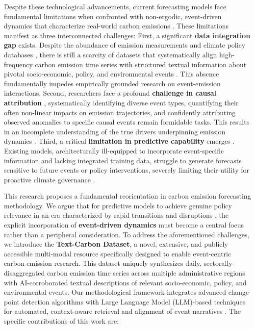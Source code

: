 Despite these technological advancements, current forecasting models face fundamental limitations when confronted with non-ergodic, event-driven dynamics that characterize real-world carbon emissions \cite{peters2022climate}. These limitations manifest as three interconnected challenges: First, a significant \textbf{data integration gap} exists. Despite the abundance of emission measurements \cite{crippa2021edgar} and climate policy databases \cite{nascimento2022global}, there is still a scarcity of datasets that systematically align high-frequency carbon emission time series with structured textual information about pivotal socio-economic, policy, and environmental events \cite{lamb2021climate}. This absence fundamentally impedes empirically grounded research on event-emission interactions. Second, researchers face a profound \textbf{challenge in causal attribution} \cite{gasser2020understanding}, systematically identifying diverse event types, quantifying their often non-linear impacts on emission trajectories, and confidently attributing observed anomalies to specific causal events remain formidable tasks. This results in an incomplete understanding of the true drivers underpinning emission dynamics \cite{liu2022drivers}. Third, a critical \textbf{limitation in predictive capability} emerges \cite{hausfather2020evaluating}. Existing models, architecturally ill-equipped to incorporate event-specific information and lacking integrated training data, struggle to generate forecasts sensitive to future events or policy interventions, severely limiting their utility for proactive climate governance \cite{grant2020cost}.

This research proposes a fundamental reorientation in carbon emission forecasting methodology. We argue that for predictive models to achieve genuine policy relevance in an era characterized by rapid transitions and disruptions \cite{geels2017sociotechnical}, the explicit incorporation of \textbf{event-driven dynamics} must become a central focus rather than a peripheral consideration. To address the aforementioned challenges, we introduce the \textbf{Text-Carbon Dataset}, a novel, extensive, and publicly accessible multi-modal resource specifically designed to enable event-centric carbon emission research. This dataset uniquely synthesizes daily, sectorally-disaggregated carbon emission time series across multiple administrative regions with AI-corroborated textual descriptions of relevant socio-economic, policy, and environmental events. Our methodological framework integrates advanced change-point detection algorithms \cite{truong2020selective} with Large Language Model (LLM)-based techniques for automated, context-aware retrieval and alignment of event narratives \cite{zhao2023survey}. The specific contributions of this work are:

